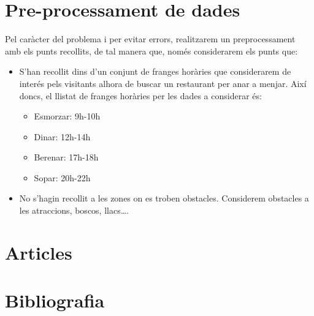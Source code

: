 \documentclass[12pt]{article}
\begin{document}
\section{Pre-processament de dades}
Pel caràcter del problema i per evitar errors, realitzarem un preprocessament amb els punts recollits, de tal manera que, només considerarem els punts que:
\begin{itemize}
	\item S’han recollit dins d’un conjunt de franges horàries que considerarem de interés pels visitants alhora de buscar un restaurant per anar a menjar. 
	Així doncs, el llistat de franges horàries per les dades a considerar és:
	\begin{itemize}
		\item Esmorzar: 9h-10h
		\item Dinar: 12h-14h
		\item Berenar: 17h-18h
		\item Sopar: 20h-22h
	\end{itemize}

	\item No s’hagin recollit a les zones on es troben obstacles. 
	Considerem obstacles a les atraccions, boscos, llacs….
\end{itemize}



\clearpage
\section{Articles}



\clearpage
\section{Bibliografia}
\clearpage
\end{document}
